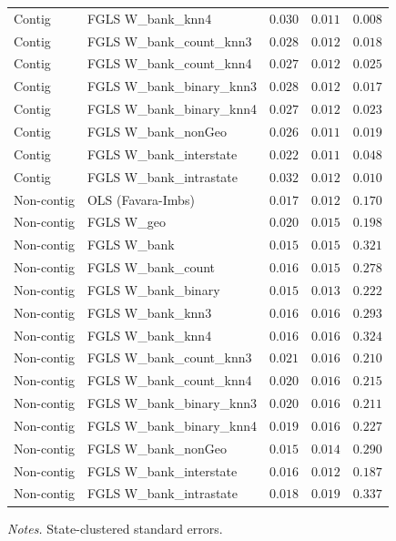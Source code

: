 \begin{table}[htbp]
\begin{tabular}{llccc}
    Contig & FGLS W\_bank\_knn4 & $0.030$ & $0.011$ & $0.008$ \\
    Contig & FGLS W\_bank\_count\_knn3 & $0.028$ & $0.012$ & $0.018$ \\
    Contig & FGLS W\_bank\_count\_knn4 & $0.027$ & $0.012$ & $0.025$ \\
    Contig & FGLS W\_bank\_binary\_knn3 & $0.028$ & $0.012$ & $0.017$ \\
    Contig & FGLS W\_bank\_binary\_knn4 & $0.027$ & $0.012$ & $0.023$ \\
    Contig & FGLS W\_bank\_nonGeo & $0.026$ & $0.011$ & $0.019$ \\
    Contig & FGLS W\_bank\_interstate & $0.022$ & $0.011$ & $0.048$ \\
    Contig & FGLS W\_bank\_intrastate & $0.032$ & $0.012$ & $0.010$ \\
    \addlinespace
    Non-contig & OLS (Favara-Imbs) & $0.017$ & $0.012$ & $0.170$ \\
    Non-contig & FGLS W\_geo & $0.020$ & $0.015$ & $0.198$ \\
    Non-contig & FGLS W\_bank & $0.015$ & $0.015$ & $0.321$ \\
    Non-contig & FGLS W\_bank\_count & $0.016$ & $0.015$ & $0.278$ \\
    Non-contig & FGLS W\_bank\_binary & $0.015$ & $0.013$ & $0.222$ \\
    Non-contig & FGLS W\_bank\_knn3 & $0.016$ & $0.016$ & $0.293$ \\
    Non-contig & FGLS W\_bank\_knn4 & $0.016$ & $0.016$ & $0.324$ \\
    Non-contig & FGLS W\_bank\_count\_knn3 & $0.021$ & $0.016$ & $0.210$ \\
    Non-contig & FGLS W\_bank\_count\_knn4 & $0.020$ & $0.016$ & $0.215$ \\
    Non-contig & FGLS W\_bank\_binary\_knn3 & $0.020$ & $0.016$ & $0.211$ \\
    Non-contig & FGLS W\_bank\_binary\_knn4 & $0.019$ & $0.016$ & $0.227$ \\
    Non-contig & FGLS W\_bank\_nonGeo & $0.015$ & $0.014$ & $0.290$ \\
    Non-contig & FGLS W\_bank\_interstate & $0.016$ & $0.012$ & $0.187$ \\
    Non-contig & FGLS W\_bank\_intrastate & $0.018$ & $0.019$ & $0.337$ \\
    \bottomrule
  \end{tabular}
  \begin{tablenotes}\footnotesize
  \item \emph{Notes.} State-clustered standard errors.
  \end{tablenotes}
\end{table}

